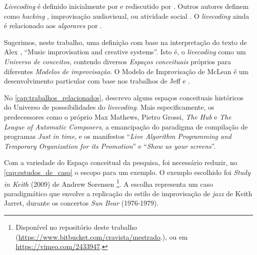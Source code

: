 \emph{Livecoding} é definido inicialmente por  e rediscutido por . Outros autores definem como \emph{hacking} \cite{mclean_hacking_2006},  improvisação audiovisual\cite{magnusson_algorithms_2011,collins_origins_2014}, ou atividade social \cite{mori_analysing_2015,prospero_social_2015}. O \emph{livecoding} ainda é relacionado aos \emph{algoraves} por .  

Sugerimos, neste trabalho, uma definição com base na interpretação do texto de Alex , ``Music improvisation and creative systems''. Isto é, o \emph{livecoding} como um \emph{Universo de conceitos}, contendo diversos \emph{Espaços conceituais} próprios para diferentes \emph{Modelos de improvisação}. O Modelo de Improvisação de McLean é um desenvolvimento particular com base nos trabalhos de Jeff  e . 

No \autoref{cap:trabalhos_relacionados}, descrevo alguns espaços conceituais históricos do Universo de posssibilidades do \emph{livecoding}. Mais especificamente, os predecessores como o próprio Max Mathews, Pietro Grossi, \emph{The Hub} e \emph{The League of Automatic Composers}, a emancipação do paradigma de compilação de programas \emph{Just in time}, e os manifestos ``\emph{Live Algorithm Programming and Temporary Organization for its Promotion}'' e ``\emph{Show us your screens}''.

Com a variedade do Espaço conceitual da pesquisa, foi necessário reduzir, no \autoref{cap:estudos_de_caso} o escopo para um exemplo. O exemplo escolhido foi \emph{Study in Keith} (2009) de Andrew Sorensen \footnote{Disponível no repositório deste trabalho (\url{https://www.bitbucket.com/cravista/mestrado}.), ou em \url{https://vimeo.com/2433947}.}. A escolha representa um caso paradigmático que envolve a replicação do estilo de improvisação de \emph{jazz} de Keith Jarret, durante os concertos \emph{Sun Bear} (1976-1979). 